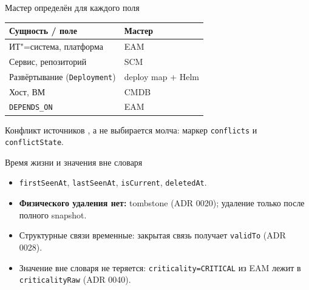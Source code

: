\begin{frame}{Мастер определён для каждого поля}
  \small
  \begin{tabular}{@{}ll@{}}
    \toprule
    \textbf{Сущность / поле} & \textbf{Мастер} \\
    \midrule
    ИТ"=система, платформа & EAM \\
    Сервис, репозиторий & SCM \\
    Развёртывание (\texttt{Deployment}) & deploy map + Helm \\
    Хост, ВМ & CMDB \\
    \texttt{DEPENDS\_ON} & EAM \\
    \bottomrule
  \end{tabular}

  \vspace{3mm}
  Конфликт источников , а не выбирается молча: маркер \texttt{conflicts} и \texttt{conflictState}.
\end{frame}

\begin{frame}{Время жизни и значения вне словаря}
  \begin{itemize}
    \item \texttt{firstSeenAt}, \texttt{lastSeenAt}, \texttt{isCurrent}, \texttt{deletedAt}.
    \item \textbf{Физического удаления нет:} tombstone (ADR 0020); удаление только после полного snapshot.
    \item Структурные связи временные: закрытая связь получает \texttt{validTo} (ADR 0028).
    \item Значение вне словаря не теряется: \texttt{criticality=CRITICAL} из EAM лежит в \texttt{criticalityRaw} (ADR 0040).
  \end{itemize}
\end{frame}


